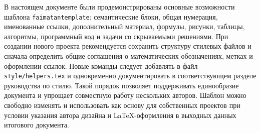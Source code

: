 В настоящем документе были продемонстрированы основные возможности шаблона \texttt{faimatantemplate}: семантические блоки, общая нумерация, именованные ссылки, дополнительный материал, формулы, рисунки, таблицы, алгоритмы, программный код и задачи со скрываемыми решениями.
При создании нового проекта рекомендуется сохранить структуру стилевых файлов и сначала определить общие соглашения о математических обозначениях, метках и оформлении ссылок.
Новые команды следует добавлять в файл \verb|style/helpers.tex| и одновременно документировать в соответствующем разделе руководства по стилю.
Такой порядок позволяет поддерживать единообразие документа и упрощает совместную работу нескольких авторов.
Шаблон можно свободно изменять и использовать как основу для собственных проектов при условии указания автора дизайна и \LaTeX-оформления в выходных данных итогового документа.